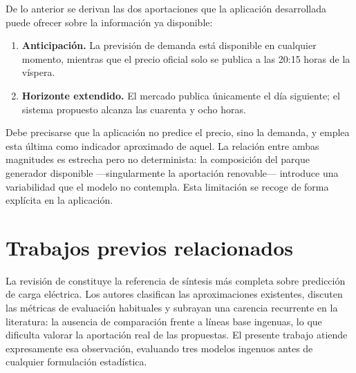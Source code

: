 De lo anterior se derivan las dos aportaciones que la aplicación desarrollada
puede ofrecer sobre la información ya disponible:

\begin{enumerate}
  \item \textbf{Anticipación.} La previsión de demanda está disponible en
        cualquier momento, mientras que el precio oficial solo se publica a las
        20:15 horas de la víspera.

  \item \textbf{Horizonte extendido.} El mercado publica únicamente el día
        siguiente; el sistema propuesto alcanza las cuarenta y ocho horas.
\end{enumerate}

Debe precisarse que la aplicación no predice el precio, sino la demanda, y emplea
esta última como indicador aproximado de aquel. La relación entre ambas magnitudes
es estrecha pero no determinista: la composición del parque generador disponible
—singularmente la aportación renovable— introduce una variabilidad que el modelo
no contempla. Esta limitación se recoge de forma explícita en la aplicación.



\section{Trabajos previos relacionados}


La revisión de \textcite{hong2016probabilistic} constituye la referencia de
síntesis más completa sobre predicción de carga eléctrica. Los autores clasifican
las aproximaciones existentes, discuten las métricas de evaluación habituales y
subrayan una carencia recurrente en la literatura: la ausencia de comparación
frente a líneas base ingenuas, lo que dificulta valorar la aportación real de las
propuestas. El presente trabajo atiende expresamente esa observación, evaluando
tres modelos ingenuos antes de cualquier formulación estadística.

